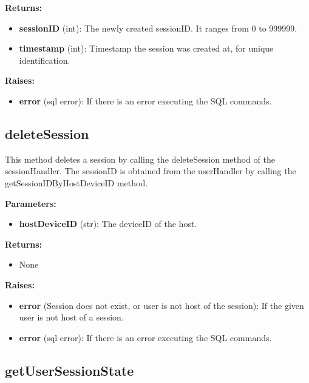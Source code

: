 \documentclass[oneside, nenglish]{sdqtechreport}
\begin{document}
\begin{itemize}
\textbf{Returns:}

\begin{itemize}
    \item \textbf{sessionID} (int): The newly created sessionID. It ranges from 0 to 999999.
    \item \textbf{timestamp} (int): Timestamp the session was created at, for unique identification.
\end{itemize}

\textbf{Raises:}

\begin{itemize}
    \item \textbf{error} (sql error): If there is an error executing the SQL commands.
\end{itemize}


\subsection{deleteSession}

This method deletes a session by calling the deleteSession method of the sessionHandler. The sessionID is obtained from the userHandler by calling the getSessionIDByHostDeviceID method.

\textbf{Parameters:}

\begin{itemize}
    \item \textbf{hostDeviceID} (str): The deviceID of the host.
\end{itemize}

\textbf{Returns:}

\begin{itemize}
    \item None
\end{itemize}

\textbf{Raises:}

\begin{itemize}
    \item \textbf{error} (Session does not exist, or user is not host of the session): If the given user is not host of a session.
    \item \textbf{error} (sql error): If there is an error executing the SQL commands.
\end{itemize}


\subsection{getUserSessionState}


\end{itemize}
\end{document}
